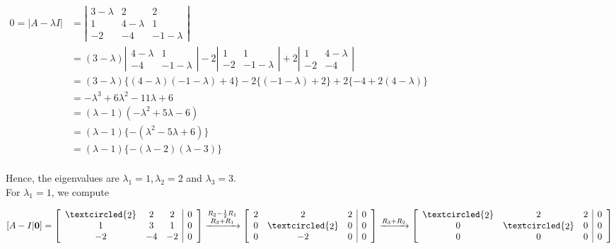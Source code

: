 \documentclass[
  letterpaper,
  DIV=11,
  numbers=noendperiod]{scrartcl}
\theoremstyle{remark}
\begin{document}
\(\begin{alignedat}{2}
        0 = |A - \lambda I| &= \left|\begin{array}{ccc}
            3-\lambda & 2 & 2 \\
            1 & 4-\lambda & 1 \\
            -2 & -4 & -1-\lambda
        \end{array}\right| \\
        {} &= (3-\lambda ) \left|\begin{array}{cc} 4-\lambda & 1 \\ -4 & -1-\lambda \end{array}\right| - 2 \left|\begin{array}{cc} 1 & 1 \\ -2 & -1-\lambda \end{array}\right| + 2 \left|\begin{array}{cc} 1 & 4-\lambda \\ -2 & -4\end{array}\right| \\
        {} &= (3-\lambda ) \{(4-\lambda )(-1-\lambda )+4\} - 2\{(-1-\lambda )+2\} + 2\{-4+2(4-\lambda )\} \\
        {} &= -\lambda ^3 + 6\lambda ^2 - 11\lambda + 6 \\
        {} &= (\lambda -1)(-\lambda ^2 + 5\lambda - 6) \\
        {} &= (\lambda -1)\{-(\lambda ^2 - 5\lambda + 6)\} \\
        {} &= (\lambda -1)\{-(\lambda - 2)(\lambda - 3)\} \\
    \end{alignedat}\)

Hence, the eigenvalues are \(\lambda _{1} = 1, \lambda _{2} = 2\) and
\(\lambda _{3} = 3\).\\
For \(\lambda _{1}=1\), we compute

\(\left[A - I | \mathbf{0}\right] = \left[\begin{array}{ccc | c} \textcircled{\raisebox{-0.9pt}{2}} & 2 & 2 & 0 \\ 1 & 3 & 1 & 0 \\ -2 & -4 & -2 & 0 \end{array}\right] \xrightarrow{\begin{subarray}{c} R_{2} - \frac{1}{2}R_{1} \\ R_{3} + R_{1} \end{subarray}} \left[\begin{array}{ccc | c} 2 & 2 & 2 & 0 \\ 0 & \textcircled{\raisebox{-0.9pt}{2}} & 0 & 0 \\ 0 & -2 & 0 & 0 \end{array}\right] \xrightarrow{R_{3} + R_{2}} \left[\begin{array}{ccc | c} \textcircled{\raisebox{-0.9pt}{2}} & 2 & 2 & 0 \\ 0 & \textcircled{\raisebox{-0.9pt}{2}} & 0 & 0 \\ 0 & 0 & 0 & 0 \end{array}\right]\)
\end{document}
